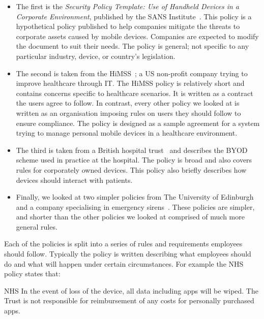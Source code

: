 \documentclass[thesis.tex]{subfiles}
\begin{document}
\begin{itemize}
\item The first is the \emph{Security Policy Template: Use of Handheld Devices
    in a Corporate Environment}, published by the SANS
  Institute~\cite{nicholas_r._c._guerin_security_2008}. This policy is a
  hypothetical policy published to help companies mitigate the threats to
  corporate assets caused by mobile devices. Companies are expected to modify the
  document to suit their needs. The policy is general; not specific to any
  particular industry, device, or country's legislation.
\item The second is taken from the
  \ac{HiMSS}~\cite{healthcare_information_and_management_systems_society_mobile_2012};
  a US non-profit company trying to improve healthcare through IT. The \ac{HiMSS}
  policy is relatively short and contains concerns specific to healthcare
  scenarios. It is written as a contract the users agree to follow. In contrast,
  every other policy we looked at is written as an organisation imposing rules on
  users they should follow to ensure compliance. The policy is designed as a
  sample agreement for a system trying to manage personal mobile devices in a
  healthcare environment.
\item The third is taken from a British hospital
  trust~\cite{kennington_mobiles_2014} and describes the BYOD scheme used in
  practice at the hospital.  The policy is broad and also covers rules for
  corporately owned devices.  This policy also briefly describes how devices
  should interact with patients.
\item Finally, we looked at two simpler policies from The University of
  Edinburgh~\cite{williamson_bring_2015} and a company specialising in emergency
  sirens~\cite{code3pse.org_sample_????}. These policies are simpler, and shorter
  than the other policies we looked at comprised of much more general rules.
\end{itemize}

Each of the policies is split into a series of rules and requirements employees
should follow. Typically the policy is written describing what employees should
do and what will happen under certain circumstances. For example the NHS policy
states that:

\begin{policyrule}{NHS}
  In the event of loss of the device, all data including apps will be wiped. The Trust
  is not responsible for reimbursement of any costs for personally purchased apps.
\end{policyrule}
\end{document}
